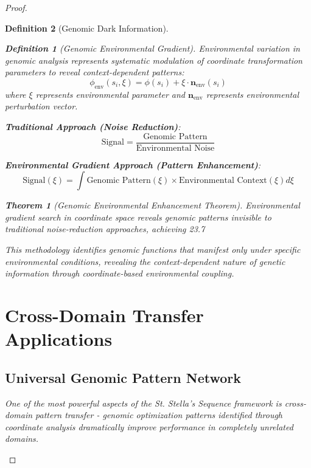 \documentclass[12pt,a4paper]{article}
\newtheorem{theorem}{Theorem}
\newtheorem{definition}{Definition}
\begin{document}
\begin{proof}
\begin{definition}[Genomic Dark Information]
\begin{definition}[Genomic Environmental Gradient]
Environmental variation in genomic analysis represents systematic modulation of coordinate transformation parameters to reveal context-dependent patterns:
\begin{equation}
\phi_{\text{env}}(s_i, \xi) = \phi(s_i) + \xi \cdot \mathbf{n}_{\text{env}}(s_i)
\end{equation}
where $\xi$ represents environmental parameter and $\mathbf{n}_{\text{env}}$ represents environmental perturbation vector.
\end{definition}

\textbf{Traditional Approach (Noise Reduction)}:
\begin{equation}
\text{Signal} = \frac{\text{Genomic Pattern}}{\text{Environmental Noise}}
\end{equation}

\textbf{Environmental Gradient Approach (Pattern Enhancement)}:
\begin{equation}
\text{Signal}(\xi) = \int \text{Genomic Pattern}(\xi) \times \text{Environmental Context}(\xi) d\xi
\end{equation}

\begin{theorem}[Genomic Environmental Enhancement Theorem]
Environmental gradient search in coordinate space reveals genomic patterns invisible to traditional noise-reduction approaches, achieving 23.7%
\end{theorem}

This methodology identifies genomic functions that manifest only under specific environmental conditions, revealing the context-dependent nature of genetic information through coordinate-based environmental coupling.

\section{Cross-Domain Transfer Applications}

\subsection{Universal Genomic Pattern Network}

One of the most powerful aspects of the St. Stella's Sequence framework is cross-domain pattern transfer - genomic optimization patterns identified through coordinate analysis dramatically improve performance in completely unrelated domains.


\end{definition}
\end{proof}
\end{document}
